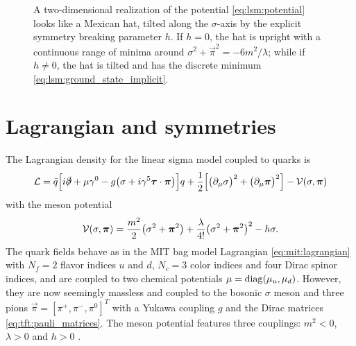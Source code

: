 \begin{figure}
\centering
{}
\caption{\label{fig:lsm:potential}%
	A two-dimensional realization of the potential \eqref{eq:lsm:potential} looks like a Mexican hat, tilted along the $\sigma$-axis by the explicit symmetry breaking parameter $h$.
	If $h = 0$, the hat is upright with a continuous range of minima around $\sigma^2 + \vec\pi^2 = -6m^2 / \lambda$;
	while if $h \neq 0$, the hat is tilted and has the discrete minimum \eqref{eq:lsm:ground_state_implicit}.
}
\end{figure}

\section{Lagrangian and symmetries}

The Lagrangian density for the linear sigma model coupled to quarks is \cite{ref:jo_lsm_consistent_physical}
\begin{equation}
	\mathcal{L} = \bar{q} \Big[ i \slashed\partial + \mu \gamma^0 - g \big( \sigma + i \gamma^5 {\bm{\tau}} \cdot {\bm{\pi}} \big) \Big] q
	      + \frac12 \Big[ \big( \partial_\mu \sigma \big)^2 + \big( \partial_\mu {\bm{\pi}} \big)^2 \Big] - \mathcal{V}(\sigma,{\bm{\pi}})
\label{eq:lsm:lagrangian}
\end{equation}
with the meson potential
\begin{equation}
	\mathcal{V}(\sigma, {\bm{\pi}}) = \frac{m^2}{2} \big( \sigma^2 + {\bm{\pi}}^2 \big) + \frac{\lambda}{4!} \big( \sigma^2 + {\bm{\pi}}^2 \big)^2 - h \sigma .
\label{eq:lsm:potential}
\end{equation}
The quark fields behave as in the MIT bag model Lagrangian \eqref{eq:mit:lagrangian} with $N_f=2$ flavor indices $u$ and $d$, $N_c=3$ color indices and four Dirac spinor indices, and are coupled to two chemical potentials $\mu = \operatorname{diag} (\mu_u, \mu_d)$.
However, they are now seemingly massless and coupled to the bosonic $\sigma$ meson and three pions $\vec\pi = [\pi^+, \pi^-, \pi^0]^T$ with a Yukawa coupling $g$ and the Dirac matrices \eqref{eq:tft:pauli_matrices}.
The meson potential features three couplings: $m^2<0$, $\lambda>0$ and $h>0$ .

